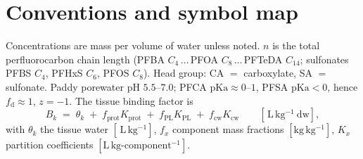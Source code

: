 \documentclass[11pt]{article}
\newcommand{\Kcw}{\ensuremath{K_{\mathrm{cw}}}}
\newcommand{\Bk}{\ensuremath{B_{k}}}
\newcommand{\fd}{\ensuremath{f_{\mathrm{d}}}}
\newcommand{\Lkg}{\ensuremath{\,\mathrm{L\,kg^{-1}}}}
\begin{document}
\section{Conventions and symbol map}\label{sec:conv}

Concentrations are mass per volume of water unless noted. $n$ is the total perfluorocarbon chain
length (PFBA $C_4\,\ldots\,$PFOA $C_8\,\ldots\,$PFTeDA $C_{14}$; sulfonates PFBS $C_4$,
PFHxS $C_6$, PFOS $C_8$). Head group: CA $=$ carboxylate, SA $=$ sulfonate. Paddy porewater pH
$5.5$--$7.0$; PFCA $\mathrm{pKa}\approx0$--$1$, PFSA $\mathrm{pKa}<0$, hence $\fd\approx1$, $z=-1$.
The tissue binding factor is
\begin{equation}\label{eq:Bk}
\Bk \;=\; \theta_k \;+\; f_{\mathrm{prot}}K_{\mathrm{prot}} \;+\; f_{\mathrm{PL}}K_{\mathrm{PL}}
\;+\; f_{\mathrm{cw}}\Kcw \qquad [\Lkg\ \text{dw}],
\end{equation}
with $\theta_k$ the tissue water $[\Lkg]$, $f_x$ component mass fractions $[\mathrm{kg\,kg^{-1}}]$,
$K_x$ partition coefficients $[\mathrm{L\,kg\text{-}component^{-1}}]$.
\end{document}
